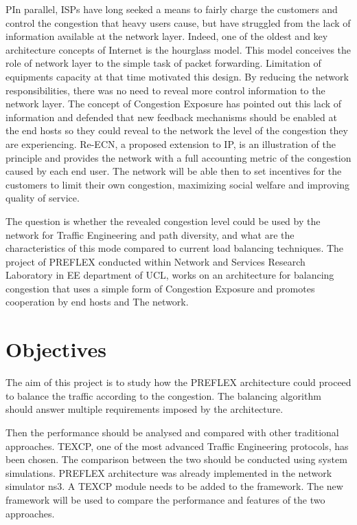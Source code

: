 PIn parallel, ISPs have long seeked a means to fairly charge the customers and control the congestion that heavy users cause, but have struggled from the lack of information available at the network layer. Indeed, one of the oldest and key architecture concepts of Internet is the hourglass model. This model conceives the role of network layer to the simple task of packet forwarding. Limitation of equipments capacity at that time motivated this design. By reducing the network responsibilities, there was no need to reveal more control information to the network layer. The concept of Congestion Exposure \cite{} has pointed out this lack of information and defended that new feedback mechanisms should be enabled at the end hosts so they could reveal to the network the level of the congestion they are experiencing. Re-ECN, a proposed extension to IP, is an illustration of the principle and provides the network with a full accounting metric of the congestion caused by each end user. The network will be able then to set incentives for the customers to limit their own congestion, maximizing social welfare and improving quality of service.

The question is whether the revealed congestion level could be used by the network for Traffic Engineering and path diversity, and what are the characteristics of this mode compared to current load balancing techniques. The project of PREFLEX  conducted within Network and Services Research Laboratory in EE department of UCL, works on an architecture for balancing congestion that uses a simple form of Congestion Exposure and promotes cooperation by end hosts and The network.

\section{Objectives}

The aim of this project is to study how the PREFLEX architecture could proceed to balance the traffic according to the congestion. The balancing algorithm should answer multiple requirements imposed by the architecture. 

Then the performance should be analysed and compared with other traditional approaches. TEXCP, one of the most advanced Traffic Engineering protocols, has been chosen. The comparison between the two should be conducted using system simulations. PREFLEX architecture was already implemented in the network simulator ns3. A TEXCP module needs to be added to the framework.
The new framework will be used to compare the performance and features of the two approaches.

